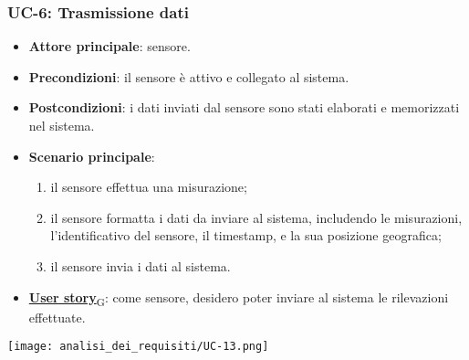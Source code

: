 \subsubsection{UC-6: Trasmissione dati}
\begin{itemize}
	\item \textbf{Attore principale}: sensore.
	\item \textbf{Precondizioni}: il sensore è attivo e collegato al sistema.
	\item \textbf{Postcondizioni}: i dati inviati dal sensore sono stati elaborati e memorizzati nel sistema.
	\item \textbf{Scenario principale}:
	      \begin{enumerate}
		      \item il sensore effettua una misurazione;
		      \item il sensore formatta i dati da inviare al sistema, includendo le misurazioni, l'identificativo del sensore, il timestamp, e la sua posizione geografica;
		      \item il sensore invia i dati al sistema.
	      \end{enumerate}
	\item \href{https://7last.github.io/docs/pb/documentazione-interna/glossario\#user-story}{\textbf{User story}\textsubscript{G}}: come sensore, desidero poter inviare al sistema le rilevazioni effettuate.
\end{itemize}

\begin{center}
	\texttt{[image: analisi\_dei\_requisiti/UC-13.png]}
\end{center}

